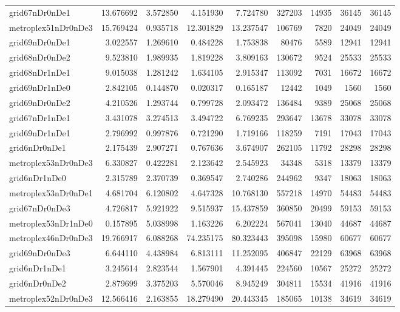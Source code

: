 \begin{longtable}{|l|r|r|r|r|r|r|r|r|}
grid67nDr0nDe1 & 13.676692 & 3.572850 & 4.151930 & 7.724780 & 327203 & 14935 & 36145 & 36145 \\
metroplex51nDr0nDe3 & 15.769424 & 0.935718 & 12.301829 & 13.237547 & 106769 & 7820 & 24049 & 24049 \\
grid69nDr0nDe1 & 3.022557 & 1.269610 & 0.484228 & 1.753838 & 80476 & 5589 & 12941 & 12941 \\
grid68nDr0nDe2 & 9.523810 & 1.989935 & 1.819228 & 3.809163 & 130672 & 9524 & 25533 & 25533 \\
grid68nDr1nDe1 & 9.015038 & 1.281242 & 1.634105 & 2.915347 & 113092 & 7031 & 16672 & 16672 \\
grid69nDr1nDe0 & 2.842105 & 0.144870 & 0.020317 & 0.165187 & 12442 & 1049 & 1560 & 1560 \\
grid69nDr0nDe2 & 4.210526 & 1.293744 & 0.799728 & 2.093472 & 136484 & 9389 & 25068 & 25068 \\
grid67nDr1nDe1 & 3.431078 & 3.274513 & 3.494722 & 6.769235 & 293647 & 13678 & 33078 & 33078 \\
grid69nDr1nDe1 & 2.796992 & 0.997876 & 0.721290 & 1.719166 & 118259 & 7191 & 17043 & 17043 \\
grid6nDr0nDe1 & 2.175439 & 2.907271 & 0.767636 & 3.674907 & 262105 & 11792 & 28298 & 28298 \\
metroplex53nDr0nDe3 & 6.330827 & 0.422281 & 2.123642 & 2.545923 & 34348 & 5318 & 13379 & 13379 \\
grid6nDr1nDe0 & 2.315789 & 2.370739 & 0.369547 & 2.740286 & 244962 & 9347 & 18063 & 18063 \\
metroplex53nDr0nDe1 & 4.681704 & 6.120802 & 4.647328 & 10.768130 & 557218 & 14970 & 54483 & 54483 \\
grid67nDr0nDe3 & 4.726817 & 5.921922 & 9.515937 & 15.437859 & 360850 & 20499 & 59153 & 59153 \\
metroplex53nDr1nDe0 & 0.157895 & 5.038998 & 1.163226 & 6.202224 & 567041 & 13040 & 44687 & 44687 \\
metroplex46nDr0nDe3 & 19.766917 & 6.088268 & 74.235175 & 80.323443 & 395098 & 15980 & 60677 & 60677 \\
grid69nDr0nDe3 & 6.644110 & 4.438984 & 6.813111 & 11.252095 & 406847 & 22129 & 63968 & 63968 \\
grid6nDr1nDe1 & 3.245614 & 2.823544 & 1.567901 & 4.391445 & 224560 & 10567 & 25272 & 25272 \\
grid6nDr0nDe2 & 2.879699 & 3.375203 & 5.570046 & 8.945249 & 304811 & 15534 & 41916 & 41916 \\
metroplex52nDr0nDe3 & 12.566416 & 2.163855 & 18.279490 & 20.443345 & 185065 & 10138 & 34619 & 34619 \\

\end{longtable}
